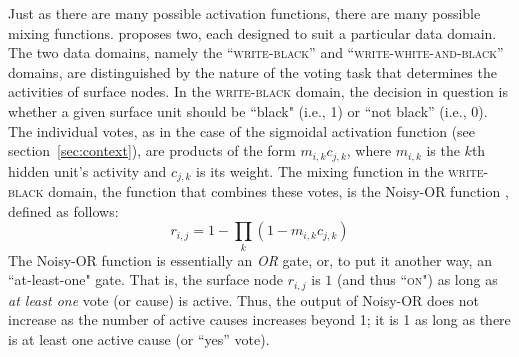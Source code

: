 Just as there are many possible activation functions, there are many 
possible mixing functions.
\citet{saund:94} proposes two, each designed 
to suit a particular data domain.  The two data domains, namely 
the ``\textsc{write-black}'' and ``\textsc{write-white-and-black}'' 
domains, are distinguished by the nature of the voting task that 
determines the activities of surface nodes. 
In the \textsc{write-black} domain, the decision in question is 
 whether a given surface unit should be ``black" (i.e., 1) or ``not black'' (i.e., 0). 
 The individual votes, as in the case of the sigmoidal activation function (see section~\ref{sec:context}), are products of the form $m_{i,k} c_{j,k}$,
 where $m_{i,k}$ is the $k$th hidden unit's activity and $c_{j,k}$ is its weight.
The mixing function in the \textsc{write-black} domain, the function that combines these votes,
 is the Noisy-OR function \citep{pearl:1988}, defined as follows:
\begin{equation}\label{eq:noisy-or}
r_{i,j} = 1 - \prod\limits_{k} (1 - m_{i,k} c_{j,k})
\end{equation}
 The Noisy-OR function is essentially an \textit{OR} gate, or, to put it another way, 
 an ``at-least-one" gate. That is, the surface node $r_{i,j}$ is $1$ (and thus ``\textsc{on}") as long as 
 \emph{at least one} vote (or cause) is active.
Thus, the output of Noisy-OR does not increase
as the number of active causes increases beyond 1; it is 1 as long as there is at least one active cause (or ``yes'' vote).

